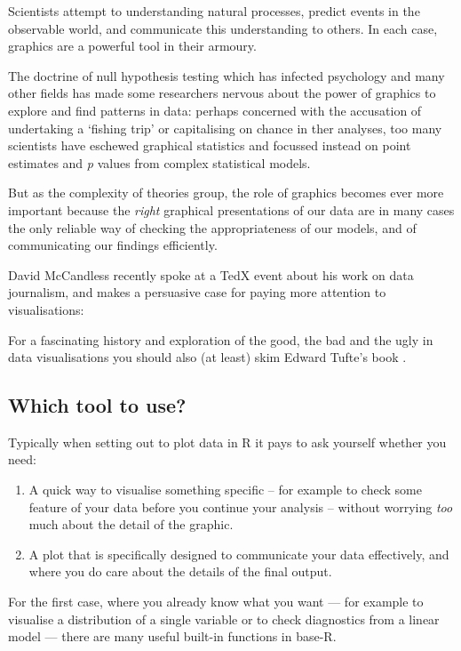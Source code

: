 \documentclass[]{article}
\theoremstyle{definition}
\theoremstyle{definition}
\theoremstyle{definition}
\theoremstyle{remark}
\begin{document}
Scientists attempt to understanding natural processes, predict events in
the observable world, and communicate this understanding to others. In
each case, graphics are a powerful tool in their armoury.

The doctrine of null hypothesis testing which has infected psychology
and many other fields has made some researchers nervous about the power
of graphics to explore and find patterns in data: perhaps concerned with
the accusation of undertaking a `fishing trip' or capitalising on chance
in ther analyses, too many scientists have eschewed graphical statistics
and focussed instead on point estimates and \emph{p} values from complex
statistical models.

But as the complexity of theories group, the role of graphics becomes
ever more important because the \emph{right} graphical presentations of
our data are in many cases the only reliable way of checking the
appropriateness of our models, and of communicating our findings
efficiently.

David McCandless recently spoke at a TedX event about his work on data
journalism, and makes a persuasive case for paying more attention to
visualisations:

For a fascinating history and exploration of the good, the bad and the
ugly in data visualisations you should also (at least) skim Edward
Tufte's book \citep{edward2001visual}.

\subsection*{Which tool to use?}\label{graphics-approaches}

Typically when setting out to plot data in R it pays to ask yourself
whether you need:

\begin{enumerate}
\def\labelenumi{\arabic{enumi}.}
\item
  A quick way to visualise something specific -- for example to check
  some feature of your data before you continue your analysis -- without
  worrying \emph{too} much about the detail of the graphic.
\item
  A plot that is specifically designed to communicate your data
  effectively, and where you do care about the details of the final
  output.
\end{enumerate}

For the first case, where you already know what you want --- for example
to visualise a distribution of a single variable or to check diagnostics
from a linear model --- there are many useful built-in functions in
base-R.
\end{document}
